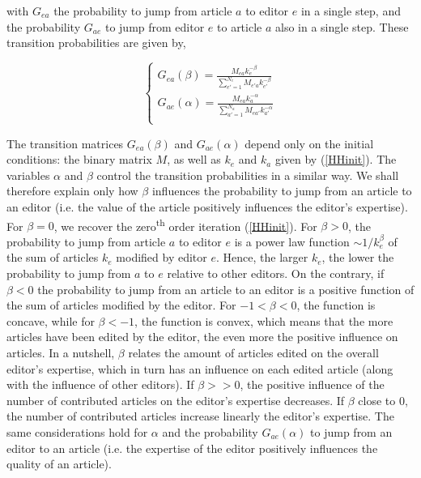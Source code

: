 with $G_{ea}$ the probability  to jump from article $a$ to editor $e$ in a single step, and the probability $G_{ae}$ to jump from editor $e$ to article $a$ also in a single step. These transition probabilities are given by,

\begin{equation}
\begin{cases}
G_{ea}(\beta) = \frac{M_{ea} k_{e}^{-\beta}}{\sum_{e' = 1}^{N_e} M_{e'a} k_{e'}^{-\beta}}\\[8pt]
G_{ae}(\alpha) = \frac{M_{ea} k_{a}^{-\alpha}}{\sum_{a' = 1}^{N_a} M_{ea'} k_{a'}^{-\alpha}}\\
 \end{cases}
\end{equation}

The transition matrices $G_{ea}(\beta)$ and $G_{ae}(\alpha)$ depend only on the initial conditions: the binary matrix $M$, as well as $k_e$ and $k_a$ given by (\ref{HHinit}). The variables $\alpha$ and $\beta$ control the transition probabilities in a similar way. We shall therefore explain only how $\beta$ influences the probability to jump from an article to an editor (i.e. the value of the article positively influences the editor's expertise). For $\beta = 0$, we recover the zero\textsuperscript{th} order iteration (\ref{HHinit}). For $\beta > 0$, the probability to jump from article $a$ to editor $e$ is a power law function $\sim 1/k_{e}^{\beta}$ of the sum of articles $k_{e}$  modified by editor $e$. Hence, the larger $k_{e}$, the lower the probability to jump from $a$ to $e$ relative to other editors. On the contrary, if $\beta < 0$ the probability to jump from an article to an editor is a positive function of the sum of articles modified by the editor. For $-1 < \beta < 0$, the function is concave, while for $\beta < -1$, the function is convex, which means that the more articles have been edited by the editor, the even more the positive influence on articles. In a nutshell, $\beta$ relates the amount of articles edited on the overall editor's expertise, which in turn has an influence on each edited article (along with the influence of other editors). If $\beta >> 0$, the positive influence of the number of contributed articles on the editor's expertise decreases. If $\beta$ close to $0$, the number of contributed articles increase linearly the editor's expertise. The same considerations hold for $\alpha$ and the probability $G_{ae}(\alpha)$ to jump from an editor to an article (i.e. the expertise of the editor positively influences the quality of an article).

